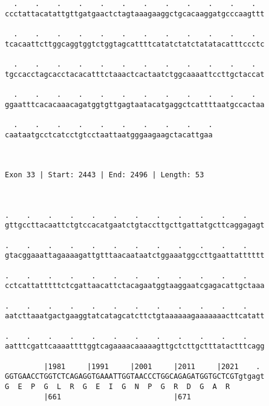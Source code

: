 \documentclass{article}
\begin{document}
\begin{Verbatim}
  .    .    .    .    .    .    .    .    .    .    .    .  
ccctattacatattgttgatgaactctagtaaagaaggctgcacaaggatgcccaagttt
                                                            
  .    .    .    .    .    .    .    .    .    .    .    .  
tcacaattcttggcaggtggtctggtagcattttcatatctatctatatacatttccctc
                                                            
  .    .    .    .    .    .    .    .    .    .    .    .  
tgccacctagcacctacacatttctaaactcactaatctggcaaaattccttgctaccat
                                                            
  .    .    .    .    .    .    .    .    .    .    .    .  
ggaatttcacacaaacagatggtgttgagtaatacatgaggctcattttaatgccactaa
                                                            
  .    .    .    .    .    .    .    .    .    .
caataatgcctcatcctgtcctaattaatgggaagaagctacattgaa
                                                
                                                
 
Exon 33 | Start: 2443 | End: 2496 | Length: 53



.    .    .    .    .    .    .    .    .    .    .    .    
gttgccttacaattctgtccacatgaatctgtaccttgcttgattatgcttcaggagagt
                                                            
.    .    .    .    .    .    .    .    .    .    .    .    
gtacggaaattagaaaagattgtttaacaataatctggaaatggccttgaattatttttt
                                                            
.    .    .    .    .    .    .    .    .    .    .    .    
cctcattatttttctcgattaacattctacagaatggtaaggaatcgagacattgctaaa
                                                            
.    .    .    .    .    .    .    .    .    .    .    .    
aatcttaaatgactgaaggtatcatagcatcttctgtaaaaaagaaaaaaacttcatatt
                                                            
.    .    .    .    .    .    .    .    .    .    .    .    
aatttcgattcaaaattttggtcagaaaacaaaaagttgctcttgctttatactttcagg
                                                            
         |1981     |1991     |2001     |2011     |2021    . 
GGTGAACCTGGTCTCAGAGGTGAAATTGGTAACCCTGGCAGAGATGGTGCTCGTgtgagt
G  E  P  G  L  R  G  E  I  G  N  P  G  R  D  G  A  R        
         |661                          |671                 
  

\end{Verbatim}
\end{document}
